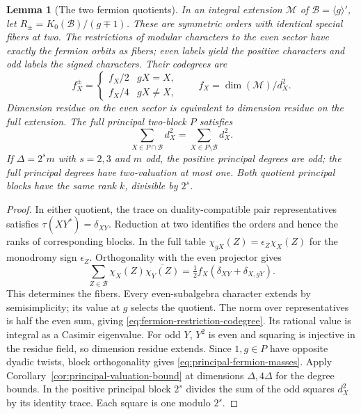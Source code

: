 \documentclass[11pt,a4paper]{article}
\numberwithin{equation}{section}
\newtheorem{lemma}[theorem]{Lemma}
\theoremstyle{remark}
\newcommand{\M}{\mathcal M}
\begin{document}
\begin{lemma}[The two fermion quotients]\label{lem:fermion-quotients}
In an integral extension $\M$ of $\mathcal B=\langle g\rangle'$, let $R_\pm=K_0(\mathcal B)/(g\mp1)$. These are symmetric orders with identical special fibers at two. The restrictions of modular characters to the even sector have exactly the fermion orbits as fibers; even labels yield the positive characters and odd labels the signed characters. Their codegrees are
\begin{equation}\label{eq:fermion-restriction-codegree}
 f_X^\pm=\begin{cases}f_X/2&gX=X,\\f_X/4&gX\ne X,\end{cases}
 \qquad f_X=\dim(\M)/d_X^2 .
\end{equation}
Dimension residue on the even sector is equivalent to dimension residue on the full extension. The full principal two-block $P$ satisfies
\begin{equation}\label{eq:principal-fermion-masses}
 \sum_{X\in P\cap\mathcal B}d_X^2=\sum_{X\in P\setminus\mathcal B}d_X^2 .
\end{equation}
If $\Delta=2^s m$ with $s=2,3$ and $m$ odd, the positive principal degrees are odd; the full principal degrees have two-valuation at most one. Both quotient principal blocks have the same rank $k$, divisible by $2^s$.
\end{lemma}\begin{proof}
In either quotient, the trace on duality-compatible pair representatives satisfies $\tau(XY^*)=\delta_{XY}$. Reduction at two identifies the orders and hence the ranks of corresponding blocks. In the full table $\chi_{gX}(Z)=\epsilon_Z\chi_X(Z)$ for the monodromy sign $\epsilon_Z$. Orthogonality with the even projector gives
\begin{equation}
 \sum_{Z\in\mathcal B}\chi_X(Z)\overline{\chi_Y(Z)}
 =\tfrac12 f_X(\delta_{XY}+\delta_{X,gY}).
\end{equation}
This determines the fibers. Every even-subalgebra character extends by semisimplicity; its value at $g$ selects the quotient. The norm over representatives is half the even sum, giving \eqref{eq:fermion-restriction-codegree}. Its rational value is integral as a Casimir eigenvalue.
For odd $Y$, $Y^2$ is even and squaring is injective in the residue field, so dimension residue extends. Since $1,g\in P$ have opposite dyadic twists, block orthogonality gives \eqref{eq:principal-fermion-masses}. Apply Corollary~\ref{cor:principal-valuation-bound} at dimensions $\Delta,4\Delta$ for the degree bounds. In the positive principal block $2^s$ divides the sum of the odd squares $d_X^2$ by its identity trace. Each square is one modulo $2^s$.
\end{proof}
\end{document}
